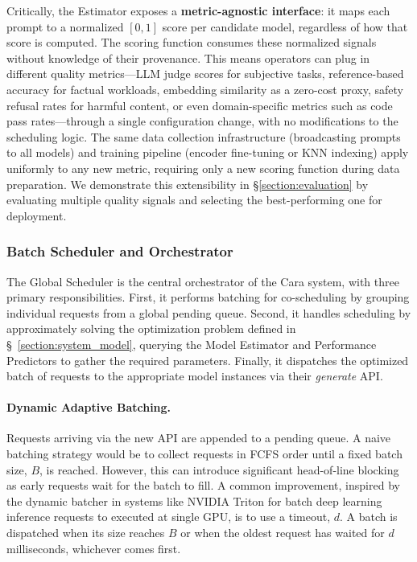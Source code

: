 \documentclass[letterpaper, anonymous, twocolumn, 10pt]{article}
\begin{document}
Critically, the Estimator exposes a \textbf{metric-agnostic interface}: it maps each prompt to a normalized $[0,1]$ score per candidate model, regardless of how that score is computed.
The scoring function consumes these normalized signals without knowledge of their provenance.
This means operators can plug in different quality metrics---LLM judge scores for subjective tasks, reference-based accuracy for factual workloads, embedding similarity as a zero-cost proxy, safety refusal rates for harmful content, or even domain-specific metrics such as code pass rates---through a single configuration change, with no modifications to the scheduling logic.
The same data collection infrastructure (broadcasting prompts to all models) and training pipeline (encoder fine-tuning or KNN indexing) apply uniformly to any new metric, requiring only a new scoring function during data preparation.
We demonstrate this extensibility in \S\ref{section:evaluation} by evaluating multiple quality signals and selecting the best-performing one for deployment.

\subsubsection{Batch Scheduler and Orchestrator}
The Global Scheduler is the central orchestrator of the Cara system, with three primary responsibilities. First, it performs batching for co-scheduling by grouping individual requests from a global pending queue. Second, it handles scheduling by approximately solving the optimization problem defined in \S~\ref{section:system_model}, querying the Model Estimator and Performance Predictors to gather the required parameters. Finally, it dispatches the optimized batch of requests to the appropriate model instances via their \textit{generate} API.

\paragraph{Dynamic Adaptive Batching.}
Requests arriving via the new API are appended to a pending queue. A naive batching strategy would be to collect requests in FCFS order until a fixed batch size, $B$, is reached. However, this can introduce significant head-of-line blocking as early requests wait for the batch to fill. A common improvement, inspired by the dynamic batcher in systems like NVIDIA Triton \cite{nvidiaTritonArchitecture} for batch deep learning inference requests to executed at single GPU, is to use a timeout, $d$. A batch is dispatched when its size reaches $B$ or when the oldest request has waited for $d$ milliseconds, whichever comes first.
\end{document}
